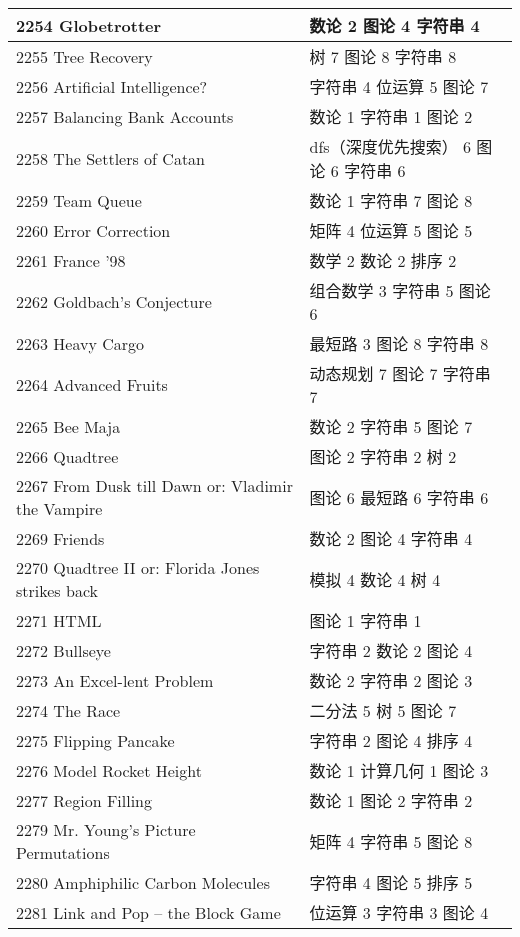\begin{longtable}{| p{} | p{} |}
 2254 Globetrotter  & 数论 2 图论 4 字符串 4 \\ \hline
 2255 Tree Recovery  & 树 7 图论 8 字符串 8 \\ \hline
 2256 Artificial Intelligence?  & 字符串 4 位运算 5 图论 7 \\ \hline
 2257 Balancing Bank Accounts  & 数论 1 字符串 1 图论 2 \\ \hline
 2258 The Settlers of Catan  & dfs（深度优先搜索） 6 图论 6 字符串 6 \\ \hline
 2259 Team Queue  & 数论 1 字符串 7 图论 8 \\ \hline
 2260 Error Correction  & 矩阵 4 位运算 5 图论 5 \\ \hline
 2261 France '98  & 数学 2 数论 2 排序 2 \\ \hline
 2262 Goldbach's Conjecture  & 组合数学 3 字符串 5 图论 6 \\ \hline
 2263 Heavy Cargo  & 最短路 3 图论 8 字符串 8 \\ \hline
 2264 Advanced Fruits  & 动态规划 7 图论 7 字符串 7 \\ \hline
 2265 Bee Maja  & 数论 2 字符串 5 图论 7 \\ \hline
 2266 Quadtree  & 图论 2 字符串 2 树 2 \\ \hline
 2267 From Dusk till Dawn or: Vladimir the Vampire  & 图论 6 最短路 6 字符串 6 \\ \hline
 2269 Friends  & 数论 2 图论 4 字符串 4 \\ \hline
 2270 Quadtree II or: Florida Jones strikes back  & 模拟 4 数论 4 树 4 \\ \hline
 2271 HTML  & 图论 1 字符串 1 \\ \hline
 2272 Bullseye  & 字符串 2 数论 2 图论 4 \\ \hline
 2273 An Excel-lent Problem  & 数论 2 字符串 2 图论 3 \\ \hline
 2274 The Race  & 二分法 5 树 5 图论 7 \\ \hline
 2275 Flipping Pancake  & 字符串 2 图论 4 排序 4 \\ \hline
 2276 Model Rocket Height  & 数论 1 计算几何 1 图论 3 \\ \hline
 2277 Region Filling  & 数论 1 图论 2 字符串 2 \\ \hline
 2279 Mr. Young's Picture Permutations  & 矩阵 4 字符串 5 图论 8 \\ \hline
 2280 Amphiphilic Carbon Molecules  & 字符串 4 图论 5 排序 5 \\ \hline
 2281 Link and Pop -- the Block Game  & 位运算 3 字符串 3 图论 4 \\ \hline

\end{longtable}
